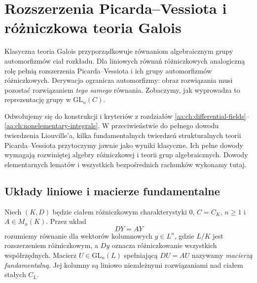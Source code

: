 \chapter{Rozszerzenia Picarda--Vessiota i różniczkowa teoria Galois}
\label{aa:ch:picard-vessiot}

Klasyczna teoria Galois przyporządkowuje równaniom algebraicznym
grupy automorfizmów ciał rozkładu. Dla liniowych równań
różniczkowych analogiczną rolę pełnią rozszerzenia
Picarda--Vessiota i ich grupy automorfizmów różniczkowych.
Derywacja ogranicza automorfizmy: obraz rozwiązania musi
pozostać rozwiązaniem \emph{tego samego} równania. Zobaczymy,
jak wyprowadza to reprezentację grupy w $\mathrm{GL}_n(C)$.

Odwołujemy się do konstrukcji i kryteriów z rozdziałów
\ref{aa:ch:differential-fields}--\ref{aa:ch:nonelementary-integrals}.
W przeciwieństwie do pełnego dowodu twierdzenia Liouville'a,
kilka fundamentalnych twierdzeń strukturalnych teorii
Picarda--Vessiota przytoczymy jawnie jako wyniki klasyczne.
Ich pełne dowody wymagają rozwiniętej algebry różniczkowej
i teorii grup algebraicznych. Dowody elementarnych
lematów i wszystkich bezpośrednich rachunków wykonamy tutaj.

\section{Układy liniowe i macierze fundamentalne}

\begin{definicja}
\label{aa:def:pv-fundamental}
Niech $(K,D)$ będzie ciałem różniczkowym
charakterystyki $0$, $C=C_K$, $n\ge1$
i $A\in M_n(K)$. Przez układ
\begin{equation}\label{aa:eq:pv-system}
 DY=AY
\end{equation}
rozumiemy równanie dla wektorów kolumnowych
$y\in L^n$, gdzie $L/K$ jest rozszerzeniem
różniczkowym, a $Dy$ oznacza różniczkowanie
wszystkich współrzędnych. Macierz
$U\in\mathrm{GL}_n(L)$ spełniającą
$DU=AU$ nazywamy \emph{macierzą fundamentalną}.
Jej kolumny są liniowo niezależnymi
rozwiązaniami nad ciałem stałych $C_L$.
\end{definicja}

